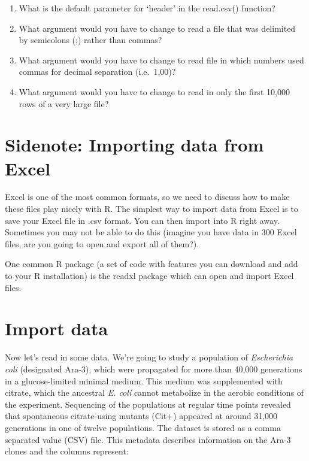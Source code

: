 \documentclass[
]{book}
\providecommand{\tightlist}{%
  \setlength{\itemsep}{0pt}\setlength{\parskip}{0pt}}
\begin{document}
\begin{enumerate}
\def\labelenumi{\arabic{enumi}.}
\tightlist
\item
  What is the default parameter for `header' in the read.csv() function?
\item
  What argument would you have to change to read a file that was delimited by semicolons (;) rather than commas?
\item
  What argument would you have to change to read file in which numbers used commas for decimal separation (i.e.~1,00)?
\item
  What argument would you have to change to read in only the first 10,000 rows of a very large file?
\end{enumerate}

\section{Sidenote: Importing data from Excel}\label{sidenote-importing-data-from-excel}

Excel is one of the most common formats, so we need to discuss how to make these files play nicely with R. The simplest way to import data from Excel is to save your Excel file in .csv format. You can then import into R right away. Sometimes you may not be able to do this (imagine you have data in 300 Excel files, are you going to open and export all of them?).

One common R package (a set of code with features you can download and add to your R installation) is the readxl package which can open and import Excel files.

\section{Import data}\label{import-data}

Now let's read in some data. We're going to study a population of \emph{Escherichia coli} (designated Ara-3), which were propagated for more than 40,000 generations in a glucose-limited minimal medium. This medium was supplemented with citrate, which the ancestral \emph{E. coli} cannot metabolize in the aerobic conditions of the experiment. Sequencing of the populations at regular time points revealed that spontaneous citrate-using mutants (Cit+) appeared at around 31,000 generations in one of twelve populations. The dataset is stored as a comma separated value (CSV) file. This metadata describes information on the Ara-3 clones and the columns represent:
\end{document}
